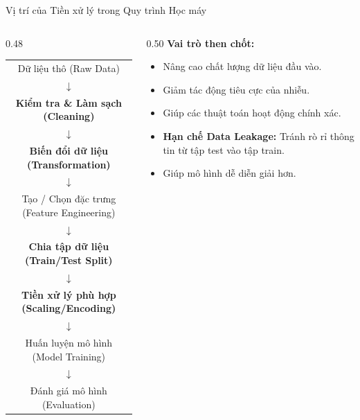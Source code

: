 \documentclass[aspectratio=169,11pt]{beamer}
\begin{document}
\begin{frame}{Vị trí của Tiền xử lý trong Quy trình Học máy}
\begin{columns}[T]
\begin{column}{0.48\textwidth}
\begin{center}
\scriptsize
\renewcommand{\arraystretch}{0.82}
\begin{tabular}{c}
Dữ liệu thô (Raw Data) \\
$\downarrow$ \\
\textbf{Kiểm tra \& Làm sạch (Cleaning)} \\
$\downarrow$ \\
\textbf{Biến đổi dữ liệu (Transformation)} \\
$\downarrow$ \\
Tạo / Chọn đặc trưng (Feature Engineering) \\
$\downarrow$ \\
\textbf{Chia tập dữ liệu (Train/Test Split)} \\
$\downarrow$ \\
\textbf{Tiền xử lý phù hợp (Scaling/Encoding)} \\
$\downarrow$ \\
Huấn luyện mô hình (Model Training) \\
$\downarrow$ \\
Đánh giá mô hình (Evaluation)
\end{tabular}
\end{center}
\end{column}
\begin{column}{0.50\textwidth}
\textbf{Vai trò then chốt:}
\begin{itemize}
  \item Nâng cao chất lượng dữ liệu đầu vào.
  \item Giảm tác động tiêu cực của nhiễu.
  \item Giúp các thuật toán hoạt động chính xác.
  \item \textbf{Hạn chế Data Leakage:} Tránh rò rỉ thông tin từ tập test vào tập train.
  \item Giúp mô hình dễ diễn giải hơn.
\end{itemize}
\end{column}
\end{columns}
\end{frame}
\end{document}
